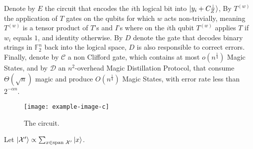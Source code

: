 \documentclass[manuscript,screen,review]{acmart}
\begin{document}
 Denote by $E$ the circuit that encodes the $i$th logical bit into $\ket{y_{i}+C_{Z}^{\perp}}$, By $T^{(w)}$ the application of $T$ gates on the qubits for which $w$ acts non-trivially, meaning $T^{(w)}$ is a tensor product of $T$'s and $I$'s where on the $i$th qubit $T^{(w)}$ applies $T$ if $w_{i}$ equals $1$, and identity otherwise. By $D$ denote the gate that decodes binary strings in $\mathbb{F}_{2}^{n}$ back into the logical space, $D$ is also responsible to correct errors.
 Finally, denote by $\mathcal{C}$ a non Clifford gate, which contains at most $o(n^{\frac{1}{4}})$ Magic States, and by $\mathcal{D}$ an $n^{2}$-overhead  Magic Distillation Protocol, that consume $\Theta(\sqrt{n})$ magic and produce $O(n^\frac{1}{4})$ Magic States, with error rate less than $2^{-\alpha n}$.     

\begin{figure}
  \label{fig:circ}
\noindent\texttt{[image: example-image-c]} 
\caption{ The circuit.   }
\end{figure}


Let $\ket{\mathcal{X}^\prime} \propto \sum_{x \in \text{span } \mathcal{X}^\prime }{\ket{x}}$.
\end{document}
